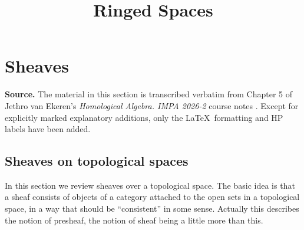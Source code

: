 



\title{Ringed Spaces}
\maketitle

\label{section-phantom}

\tableofcontents

\section{Sheaves}
\label{section-presheaves-stalks-sheaves}
\label{section-sheaves}

\medskip\noindent
{\bf Source.}
The material in this section is transcribed verbatim from
Chapter 5 of Jethro van Ekeren's \emph{Homological Algebra.
IMPA 2026-2} course notes
\cite[Chapter 5]{vanEkerenHomologicalAlgebra2026}.
Except for explicitly marked explanatory additions, only the \LaTeX\ formatting and HP labels have been added.

\subsection{Sheaves on topological spaces}
\label{section-presheaves}
\label{section-stalks}

In this section we review sheaves over a topological space. The basic idea is that a sheaf
consists of objects of a category attached to the open sets in a topological space, in a way
that should be “consistent” in some sense. Actually this describes the notion of presheaf,
the notion of sheaf being a little more than this.

